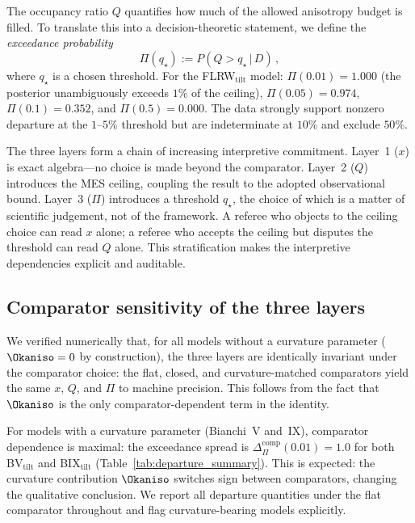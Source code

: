 The occupancy ratio $Q$ quantifies how much of the allowed
anisotropy budget is filled.  To translate this into a
decision-theoretic statement, we define the \emph{exceedance
probability}
\begin{equation}\label{eq:Pi-def}
\Pi(q_\star) := P(Q > q_\star \,|\, D)\,,
\end{equation}
where $q_\star$ is a chosen threshold.  For the
FLRW$_{\mathrm{tilt}}$ model: $\Pi(0.01) = 1.000$
(the posterior unambiguously exceeds $1\%$ of the ceiling),
$\Pi(0.05) = 0.974$,
$\Pi(0.1) = 0.352$, and
$\Pi(0.5) = 0.000$.  The data
strongly support nonzero departure at the $1$--$5\%$
threshold but are indeterminate at $10\%$ and exclude $50\%$.

\begin{remark}\label{rem:Pi-interpretation}
The three layers form a chain of increasing interpretive
commitment.  Layer~1 ($x$) is exact algebra---no choice is made
beyond the comparator.  Layer~2 ($Q$) introduces the MES
ceiling, coupling the result to the adopted observational bound.
Layer~3 ($\Pi$) introduces a threshold $q_\star$, the choice of
which is a matter of scientific judgement, not of the framework.
A referee who objects to the ceiling choice can read $x$ alone;
a referee who accepts the ceiling but disputes the threshold
can read $Q$ alone.  This stratification makes the
interpretive dependencies explicit and auditable.
\end{remark}


\subsection{Comparator sensitivity of the three layers}
\label{sec:comp-sensitivity}

We verified numerically that, for all models without a curvature
parameter ($\Okaniso = 0$ by construction), the three layers are
identically invariant under the comparator choice: the flat,
closed, and curvature-matched comparators yield the same
$x$, $Q$, and $\Pi$ to machine precision.  This follows from
the fact that $\Okaniso$ is the only comparator-dependent term
in the identity.

For models with a curvature parameter (Bianchi~V and~IX),
comparator dependence is maximal: the exceedance spread is
$\Delta_{\Pi}^{\mathrm{comp}}(0.01) = 1.0$ for both
BV$_{\mathrm{tilt}}$ and BIX$_{\mathrm{tilt}}$
(Table~\ref{tab:departure_summary}).  This is expected:
the curvature contribution $\Okaniso$ switches sign between
comparators, changing the qualitative conclusion.  We report
all departure quantities under the flat comparator throughout
and flag curvature-bearing models explicitly.



